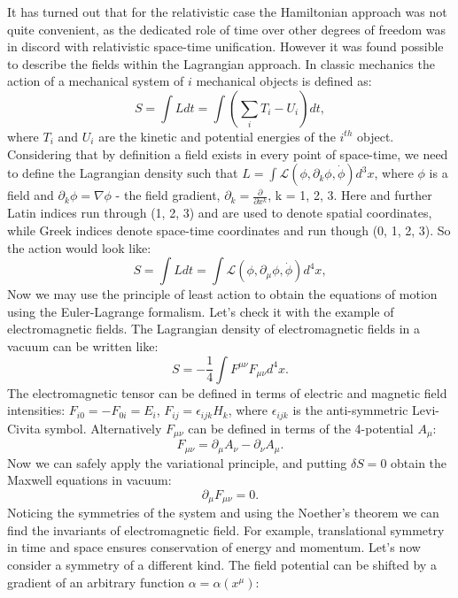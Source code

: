 It has turned out that for the relativistic case the Hamiltonian approach was not quite convenient, as the dedicated role of time over other degrees of freedom was in discord with relativistic space-time unification. However it was found possible to describe the fields within the Lagrangian approach. In classic mechanics the action of a mechanical system of $i$ mechanical objects is defined as:
 \begin{equation}
\nonumber
S = \int Ldt = \int \left( \sum_i T_i - U_i \right) dt,
\end{equation}
where $T_i$ and $U_i$ are the kinetic and potential energies of the $i^{th}$ object. Considering that by definition a field exists in every point of space-time, we need to define the Lagrangian density such that $L = \int \mathcal{L}(\phi,\partial_{k}\phi,\dot\phi ) d^3x$, where $\phi$ is a field and $\partial_{k}\phi = \nabla\phi$ - the field gradient, $\partial_{k} = \frac{\partial}{\partial x^{k}}$,  k = 1, 2, 3. Here and further Latin indices run through (1, 2, 3) and are used to denote spatial coordinates, while Greek indices denote space-time coordinates and run though (0, 1, 2, 3). So the action would look like: 
 \begin{equation}
S = \int Ldt =\int \mathcal{L}(\phi,\partial_{\mu}\phi,\dot\phi ) d^4x,
\end{equation}
Now we may use the principle of least action to obtain the equations of motion using the Euler-Lagrange formalism. Let's check it with the example of electromagnetic fields. The Lagrangian density of electromagnetic fields in a vacuum can be written like:
 \begin{equation}
S = -\frac{1}{4}\int F^{\mu \nu}F_{\mu \nu}d^4x.
\end{equation}
The electromagnetic tensor can be defined in terms of electric and magnetic field intensities: $F_{i0}=-F_{0i} = E_i$, $F_{ij} = \epsilon_{ijk}H_k$, where $\epsilon_{ijk}$ is the anti-symmetric Levi-Civita symbol. Alternatively $F_{\mu \nu}$ can be defined in terms of the 4-potential $A_{\mu}$:
 \begin{equation}
F_{\mu \nu} = \partial_{\mu}A_{\nu} - \partial_{\nu}A_{\mu}.
\end{equation}
Now we can safely apply the variational principle, and putting $\delta S=0$ obtain the Maxwell equations in vacuum:
 \begin{equation}
\partial_{\mu}F_{\mu \nu} = 0.
\end{equation}
Noticing the symmetries of the system and using the Noether's theorem\cite{Noether1918} we can find the invariants of electromagnetic field. For example, translational symmetry in time and space ensures conservation of energy and momentum. Let's now consider a symmetry of a different kind. The field potential can be shifted by a gradient of an arbitrary function $\alpha=\alpha(x^\mu)$:

